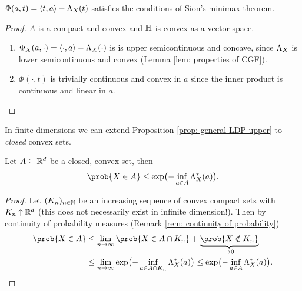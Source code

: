 \begin{lemma}
    \label{lem: check sion's conditions}
    \(\Phi(a, t) = \langle t, a\rangle - \Lambda_X(t)\) satisfies the conditions of Sion's minimax theorem.
\end{lemma}
\begin{proof}
    \(A\) is a compact and convex and \(\mathbb{H}\) is
    convex as a vector space. 
    \begin{enumerate}[label=(\roman*),nosep]
        \item \(\Phi_X(a, \cdot) = \langle\cdot, a\rangle - \Lambda_X(\cdot)\) is is upper
        semicontinuous and concave, since \(\Lambda_X\) is lower semicontinuous and
        convex (Lemma \ref{lem: properties of CGF}).
        \item \(\Phi(\cdot, t)\) is trivially continuous and convex in \(a\) since
        the inner product is continuous and linear in \(a\).
        \qedhere
    \end{enumerate}
\end{proof}

In finite dimensions we can extend Proposition \ref{prop: general LDP upper} to
\emph{closed} convex sets.

\begin{mdframed}[innertopmargin=0pt]
\begin{theorem}
    \label{thm: chernoff bound in R^d}
    Let \(A\subseteq \mathbb{R}^d\) be a \underline{closed}, \underline{convex} set, then 
    \[
        \prob{X \in A} \le \exp\bigl(-\inf_{a\in A} \CGF_X^*(a)\bigr).
    \]
\end{theorem}
\end{mdframed}
\begin{proof}
    Let \((K_n)_{n\in \mathbb{N}}\) be an increasing sequence of convex compact sets
    with \(K_n \uparrow \mathbb{R}^d\) (this does not necessarily exist in infinite
    dimension!). Then by continuity of probability measures
    (Remark \ref{rem: continuity of probability})
    \[\begin{aligned}[b]
        \prob{X \in A}
        &\le \lim_{n\to \infty} \prob{X \in A \cap K_n} + \underbrace{\prob{X \notin K_n}}_{\to 0}
        \\
        &\le \lim_{n\to \infty} \exp\bigl(- \inf_{a\in A \cap K_n} \CGF_X^*(a)\bigr)
        \le \exp\bigl(- \inf_{a\in A} \CGF_X^*(a)\bigr).
    \end{aligned}
    \qedhere
    \]
\end{proof}

